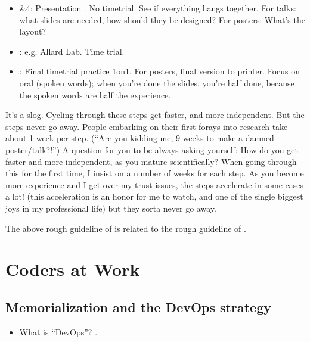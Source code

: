 \documentclass[letterpaper,10pt,english]{sphinxmanual}
\begin{document}
\begin{itemize}
\item {} 
\&4: Presentation . No time\sphinxhyphen{}trial. See if everything hangs together. For talks: what slides are needed, how should they be designed? For posters: What’s the layout?

\item {} 
:  e.g. Allard Lab. Time trial.

\item {} 
: Final time\sphinxhyphen{}trial practice 1\sphinxhyphen{}on\sphinxhyphen{}1.  For posters, final version to printer. Focus on oral (spoken words); when you’re done the slides, you’re half done, because the spoken words are half the experience.

\end{itemize}

\sphinxAtStartPar
It’s a slog. Cycling through these steps get faster, and more independent. But the steps never go away.
People embarking on their first forays into research take about 1 week per step. (“Are you kidding me, 9 weeks to make a damned poster/talk?!”)
A question for you to be always asking yourself: How do you get faster and more independent, as you mature scientifically?
When going through this for the first time, I insist on a number of weeks for each step.
As you become more experience and I get over my trust issues, the steps accelerate \textendash{}in some cases a lot! (this acceleration is an honor for me to watch, and one of the single biggest joys in my professional life) \textendash{} but they sorta never go away.

\sphinxAtStartPar
The above rough guideline of  is related to the rough guideline of {\hyperref[\detokenize{PaperWritingTips:paperwritingtips}]{}}.


\chapter{Coders at Work}
\label{\detokenize{03CodersAtWork:coders-at-work}}\label{\detokenize{03CodersAtWork:codersatwork}}\label{\detokenize{03CodersAtWork::doc}}

\section{Memorialization and the DevOps strategy}
\label{\detokenize{03CodersAtWork:memorialization-and-the-devops-strategy}}\begin{itemize}
\item {} 
\sphinxAtStartPar
What is “DevOps”? .

\end{itemize}
\end{document}
